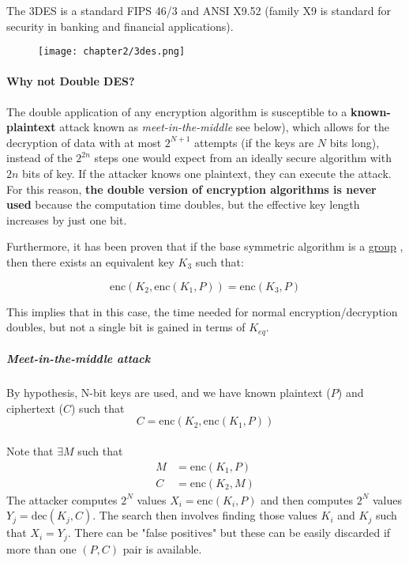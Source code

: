 The 3DES is a standard FIPS 46/3 and ANSI X9.52 (family X9 is standard for security in banking and financial
applications).

\begin{figure}[h]
    \centering
    \texttt{[image: chapter2/3des.png]}
\end{figure}

\paragraph{Why not Double DES?}
The double application of any encryption algorithm is susceptible to a \textbf{known-plaintext} attack known as \textit{meet-in-the-middle} see below), which allows for the decryption of data with at most \(2^{N+1}\) attempts (if the keys are \(N\) bits long), instead of the $2^{2n}$ steps one would expect from an ideally secure algorithm with $2n$ bits of key.
If the attacker knows one plaintext, they can execute the attack. For this reason, \textbf{the double version of encryption algorithms is never used} because the computation time doubles, but the effective key length increases by just one bit.

Furthermore, it has been proven that if the base symmetric algorithm is a \href{https://en.wikipedia.org/wiki/Group_(mathematics)}{\underline{group}} , then there exists an equivalent key \(K_3\) such that:

\[
    \text{enc}(K_2, \text{enc}(K_1, P)) = \text{enc}(K_3, P)
\]

This implies that in this case, the time needed for normal encryption/decryption doubles, but not a single bit is gained in terms of \(K_{eq}\).

\subparagraph{Meet-in-the-middle attack}\label{meetinthemiddle}
By hypothesis, N-bit keys are used, and we have known plaintext (\(P\)) and ciphertext (\(C\)) such that
\[C = \text{enc}(K_2, \text{enc}(K_1, P))\] \\
Note that \(\exists M\) such that
\begin{align*}
    M & = \text{enc}(K_1, P) \\
    C & = \text{enc}(K_2, M)
\end{align*}
The attacker computes \(2^N\) values \(X_i = \text{enc}(K_i, P)\) and then computes \(2^N\) values \(Y_j = \text{dec}(K_j, C)\).
The search then involves finding those values \(K_i\) and \(K_j\) such that \(X_i = Y_j\).
There can be "false positives" but these can be easily discarded if more than one \((P, C)\) pair is available.

